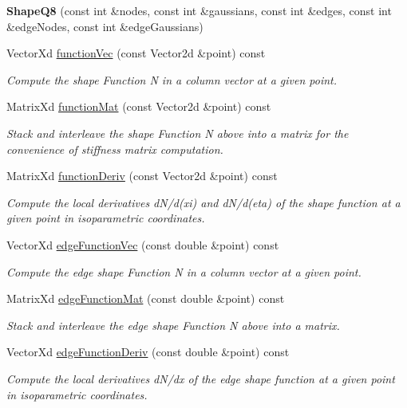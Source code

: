 \begin{DoxyCompactItemize}
\item 
\mbox{\label{class_shape_q8_a55068ac3231be316441922971879aff2}} 
{\bfseries Shape\+Q8} (const int \&nodes, const int \&gaussians, const int \&edges, const int \&edge\+Nodes, const int \&edge\+Gaussians)
\item 
Vector\+Xd \mbox{\hyperlink{class_shape_q8_a7e2de42658deff3c6912cc102b12cc96}{function\+Vec}} (const Vector2d \&point) const
\begin{DoxyCompactList}\small\item\em Compute the shape Function N in a column vector at a given point. \end{DoxyCompactList}\item 
Matrix\+Xd \mbox{\hyperlink{class_shape_q8_a5e84879bda809350eb6f70a6d01d73f1}{function\+Mat}} (const Vector2d \&point) const
\begin{DoxyCompactList}\small\item\em Stack and interleave the shape Function N above into a matrix for the convenience of stiffness matrix computation. \end{DoxyCompactList}\item 
Matrix\+Xd \mbox{\hyperlink{class_shape_q8_a49ab65aee22c0b8df4b9cb24b973a882}{function\+Deriv}} (const Vector2d \&point) const
\begin{DoxyCompactList}\small\item\em Compute the local derivatives d\+N/d(xi) and d\+N/d(eta) of the shape function at a given point in isoparametric coordinates. \end{DoxyCompactList}\item 
Vector\+Xd \mbox{\hyperlink{class_shape_q8_a6d5e89cd06d6639e599215686553adbe}{edge\+Function\+Vec}} (const double \&point) const
\begin{DoxyCompactList}\small\item\em Compute the edge shape Function N in a column vector at a given point. \end{DoxyCompactList}\item 
Matrix\+Xd \mbox{\hyperlink{class_shape_q8_a0c52ac2dbeb9297c11e03c664d4750b7}{edge\+Function\+Mat}} (const double \&point) const
\begin{DoxyCompactList}\small\item\em Stack and interleave the edge shape Function N above into a matrix. \end{DoxyCompactList}\item 
Vector\+Xd \mbox{\hyperlink{class_shape_q8_a81582d03b2fc79a8a5705111ad85163f}{edge\+Function\+Deriv}} (const double \&point) const
\begin{DoxyCompactList}\small\item\em Compute the local derivatives d\+N/dx of the edge shape function at a given point in isoparametric coordinates. \end{DoxyCompactList}\end{DoxyCompactItemize}

